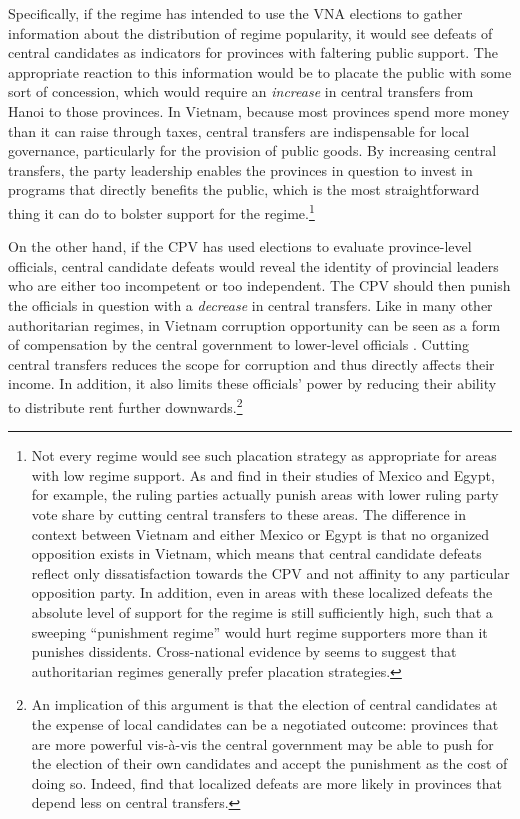 \documentclass[12pt]{article}
\newcommand{\1}{\mathbbm{1}}
\begin{document}
Specifically, if the regime has intended to use the VNA elections to gather information about the distribution of regime popularity, it would see defeats of central candidates as indicators for provinces with faltering public support. The appropriate reaction to this information would be to placate the public with some sort of concession, which would require an \textit{increase} in central transfers from Hanoi to those provinces. In Vietnam, because most provinces spend more money than it can raise through taxes, central transfers are indispensable for local governance, particularly for the provision of public goods. By increasing central transfers, the party leadership enables the provinces in question to invest in programs that directly benefits the public, which is the most straightforward thing it can do to bolster support for the regime.\footnote{Not every regime would see such placation strategy as appropriate for areas with low regime support. As \citet{Magaloni2006} and \citet{Blaydes2008} find in their studies of Mexico and Egypt, for example, the ruling parties actually punish areas with lower ruling party vote share by cutting central transfers to these areas. The difference in context between Vietnam and either Mexico or Egypt is that no organized opposition exists in Vietnam, which means that central candidate defeats reflect only dissatisfaction towards the CPV and not affinity to any particular opposition party. In addition, even in areas with these localized defeats the absolute level of support for the regime is still sufficiently high, such that a sweeping ``punishment regime'' \citep{Magaloni2006} would hurt regime supporters more than it punishes dissidents.  Cross-national evidence by \citet{Miller2015} seems to suggest that authoritarian regimes generally prefer placation strategies.}

On the other hand, if the CPV has used elections to evaluate province-level officials, central candidate defeats would reveal the identity of provincial leaders who are either too incompetent or too independent. The CPV should then punish the officials in question with a \textit{decrease} in central transfers. Like in many other authoritarian regimes, in Vietnam corruption opportunity can be seen as a form of compensation by the central government to lower-level officials \citep{Darden2008}. Cutting central transfers reduces the scope for corruption and thus directly affects their income. In addition, it also limits these officials' power by reducing their ability to distribute rent further downwards.\footnote{An implication of this argument is that the election of central candidates at the expense of local candidates can be a negotiated outcome: provinces that are more powerful vis-\`{a}-vis the central government may be able to push for the election of their own candidates and accept the punishment as the cost of doing so. Indeed, \citet{MaleskySchuler2011} find that localized defeats are more likely in provinces that depend less on central transfers.}
\end{document}

